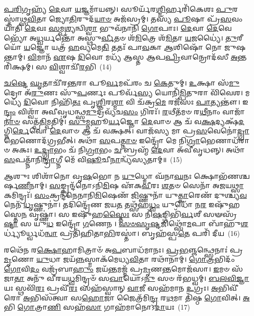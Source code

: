 \-\ul{𑌪}\-\-\ul{𑌰𑌿}\-𑌗𑍃𑌹𑍍𑌯᳴ \ul{𑌦𑍇}\-𑌵𑌾 \ul{𑌯}\-𑌜𑍍𑌞𑌮𑌾᳴𑌯𑌨𑍍𑌨𑍍। 𑌸𑍂𑌰𑍍𑌯᳴𑌰\-\ul{𑌶𑍍𑌮𑌿}\-𑌰𑍍\mbox{}𑌹𑌰𑌿᳴𑌕𑍇𑌶𑌃 \ul{𑌪𑍁}\-𑌰𑌸𑍍𑌤𑌾॑𑌥𑍍𑌸\-\ul{𑌵𑌿}\-𑌤𑌾 𑌜𑍍𑌯𑍋\-\ul{𑌤𑌿}\-𑌰𑍁𑌦᳴\-\ul{𑌯𑌾}\-\-\ul{𑍞} 𑌅𑌜᳴𑌸𑍍𑌰𑌮𑍍। 𑌤𑌸𑍍𑌯᳴ \ul{𑌪𑍂}\-𑌷𑌾 𑌪𑍍𑌰᳴\-\ul{𑌸}\-𑌵𑌂 𑌯𑌾᳴𑌤𑌿 \ul{𑌦𑍇}\-𑌵𑌃 \ul{𑌸}\-𑌮𑍍𑌪\-\ul{𑌶𑍍𑌯}\-𑌨𑍍𑌵𑌿\-\ul{𑌶𑍍𑌵𑌾} 𑌭𑍁𑌵᳴𑌨𑌾𑌨𑌿 \ul{𑌗𑍋}\-𑌪𑌾𑌃। \ul{𑌦𑍇}\-𑌵𑌾 \ul{𑌦𑍇}\-𑌵𑍇𑌭𑍍𑌯𑍋᳴ 𑌅\-\ul{𑌧𑍍𑌵}\-𑌰𑍍𑌯𑌨𑍍𑌤𑍋᳴ 𑌅𑌸𑍍𑌥𑍁\-\ul{𑌰𑍍𑌵𑍀}\-𑌤𑍞 𑌶᳴\-\ul{𑌮𑌿}\-𑌤𑍍𑌰𑍇 𑌶᳴\-\ul{𑌮𑌿}\-𑌤𑌾 \ul{𑌯}\-𑌜𑌧𑍍𑌯𑍈॑। \ul{𑌤𑍁}\-𑌰𑍀𑌯𑍋᳴ \ul{𑌯}\-𑌜𑍍𑌞𑍋 𑌯𑌤𑍍𑌰᳴ \ul{𑌹}\-𑌵𑍍𑌯𑌮𑍇\-\ul{𑌤𑌿} 𑌤𑌤𑌃᳴ 𑌪𑌾\-\ul{𑌵}\-𑌕𑌾 \ul{𑌆}\-𑌶𑌿𑌷𑍋᳴ 𑌨𑍋 𑌜𑍁𑌷𑌨𑍍𑌤𑌾𑌮𑍍। \ul{𑌵𑌿}\-𑌮𑌾𑌨᳴ \ul{𑌏}\-𑌷 \ul{𑌦𑌿}\-𑌵𑍋 𑌮𑌧𑍍𑌯᳴ 𑌆𑌸𑍍𑌤 𑌆𑌪\-\ul{𑌪𑍍𑌰𑌿}\-𑌵𑌾𑌨𑍍𑌰𑍋𑌦᳴𑌸𑍀 \ul{𑌅}\-𑌨𑍍𑌤𑌰𑌿᳴𑌕𑍍𑌷𑌮𑍍। 𑌸 \ul{𑌵𑌿}\-𑌶𑍍𑌵𑌾𑌚𑍀᳴\-\ul{𑌰}\-𑌭𑌿~(14)

\-\ul{𑌚}\-\-\ul{𑌷𑍍𑌟𑍇} \ul{𑌘𑍃}\-𑌤𑌾𑌚𑍀᳴𑌰\-\ul{𑌨𑍍𑌤}\-𑌰𑌾 𑌪𑍂\-\ul{𑌰𑍍𑌵}\-𑌮𑌪᳴𑌰𑌂 𑌚 \ul{𑌕𑍇}\-𑌤𑍁𑌮𑍍। \ul{𑌉}\-𑌕𑍍𑌷𑌾 𑌸᳴\-\ul{𑌮𑍁}\-𑌦𑍍𑌰𑍋 𑌅᳴\-\ul{𑌰𑍁}\-𑌣𑌃 𑌸𑍁᳴\-\ul{𑌪}\-𑌰𑍍𑌣𑌃 𑌪𑍂𑌰𑍍𑌵᳴\-\ul{𑌸𑍍𑌯} 𑌯𑍋𑌨𑌿᳴\-\ul{𑌮𑍍𑌪𑌿}\-𑌤𑍁𑌰𑌾 𑌵𑌿᳴𑌵𑍇𑌶। 𑌮𑌧𑍍𑌯𑍇᳴ \ul{𑌦𑌿}\-𑌵𑍋 𑌨𑌿𑌹𑌿᳴\-\ul{𑌤𑌃} 𑌪𑍃\-\ul{𑌶𑍍𑌞𑌿}\-𑌰\-\ul{𑌶𑍍𑌮𑌾} 𑌵𑌿 𑌚᳴𑌕𑍍𑌰\-\ul{𑌮𑍇} 𑌰𑌜᳴𑌸𑌃 \ul{𑌪𑌾}\-𑌤𑍍𑌯𑌨𑍍𑌤𑍗॑। 𑌇\-\ul{𑌨𑍍𑌦𑍍𑌰𑌂} 𑌵𑌿𑌶𑍍𑌵𑌾᳴ 𑌅𑌵𑍀𑌵𑍃𑌧𑌨𑍍𑌥𑍍𑌸\-\ul{𑌮𑍁}\-𑌦𑍍𑌰𑌵𑍍𑌯᳴𑌚\-\ul{𑌸𑌂} 𑌗𑌿𑌰𑌃᳴। \ul{𑌰}\-𑌥𑍀𑌤᳴𑌮𑍞 𑌰\-\ul{𑌥𑍀}\-𑌨𑌾𑌂 𑌵𑌾𑌜𑌾᳴\-\ul{𑌨𑌾}\-\-\ul{𑍞} 𑌸𑌤𑍍𑌪᳴\-\ul{𑌤𑌿}\-𑌮𑍍𑌪𑌤𑌿𑌮𑍍॑। \ul{𑌸𑍁}\-\-\ul{𑌮𑍍𑌨}\-𑌹𑍂\-\ul{𑌰𑍍𑌯}\-𑌜𑍍𑌞𑍋 \ul{𑌦𑍇}\-𑌵𑌾𑍞 𑌆 𑌚᳴ 𑌵\-\ul{𑌕𑍍𑌷}\-𑌦𑍍𑌯𑌕𑍍𑌷᳴\-\ul{𑌦}\-𑌗𑍍𑌨𑌿\-\ul{𑌰𑍍𑌦𑍇}\-𑌵𑍋 \ul{𑌦𑍇}\-𑌵𑌾𑍞 𑌆 𑌚᳴ 𑌵𑌕𑍍𑌷𑌤𑍍। 𑌵𑌾𑌜᳴𑌸𑍍𑌯 𑌮𑌾 𑌪𑍍𑌰\-\ul{𑌸}\-𑌵𑍇𑌨𑍋॑\-\ul{𑌦𑍍𑌗𑍍𑌰𑌾}\-𑌭𑍇𑌣𑍋𑌦᳴𑌗𑍍𑌰𑌭𑍀𑌤𑍍। 𑌅𑌥𑌾᳴ \ul{𑌸}\-𑌪\-\ul{𑌤𑍍𑌨𑌾}\-\-\ul{𑍞} 𑌇𑌨𑍍𑌦𑍍𑌰𑍋᳴ 𑌮𑍇 𑌨𑌿\-\ul{𑌗𑍍𑌰𑌾}\-𑌭𑍇𑌣𑌾𑌧᳴𑌰𑌾𑍞 𑌅𑌕𑌃। \ul{𑌉}\-\-\ul{𑌦𑍍𑌗𑍍𑌰𑌾}\-𑌭𑌂 𑌚᳴ 𑌨𑌿\-\ul{𑌗𑍍𑌰𑌾}\-𑌭𑌂 \ul{𑌚} 𑌬𑍍𑌰𑌹𑍍𑌮᳴ \ul{𑌦𑍇}\-𑌵𑌾 𑌅᳴𑌵𑍀𑌵𑍃𑌧𑌨𑍍𑌨𑍍। 𑌅𑌥𑌾᳴ \ul{𑌸}\-𑌪𑌤𑍍𑌨𑌾᳴𑌨𑌿\-\ul{𑌨𑍍𑌦𑍍𑌰𑌾}\-𑌗𑍍𑌨𑍀 𑌮𑍇᳴ 𑌵𑌿\-\ul{𑌷𑍂}\-𑌚𑍀\-\ul{𑌨𑌾}\-𑌨𑍍𑌵𑍍𑌯᳴𑌸𑍍𑌯𑌤𑌾𑌮𑍍॥~(15)

{\anuvakamend[{\-\ul{𑌦𑍇}\-𑌵𑌾𑌃 \ul{𑌶}\-𑌤𑌪᳴𑌯𑌾 \ul{𑌅}\-𑌭𑌿 𑌵𑌾𑌜᳴\-\ul{𑌸𑍍𑌯} 𑌷𑌡𑍍𑌵𑌿𑍞᳴𑌶𑌤𑌿𑌶𑍍𑌚}]}%

\-\ul{𑌆}\-𑌶𑍁𑌃 𑌶𑌿𑌶𑌾᳴𑌨𑍋 𑌵𑍃\-\ul{𑌷}\-𑌭𑍋 𑌨 \ul{𑌯𑍁}\-𑌧𑍍𑌮𑍋 𑌘᳴𑌨𑌾\-\ul{𑌘}\-𑌨𑌃 𑌕𑍍𑌷𑍋𑌭᳴𑌣𑌶𑍍𑌚𑌰𑍍\mbox{}𑌷\-\ul{𑌣𑍀}\-𑌨𑌾𑌮𑍍। \ul{𑌸}\-𑌙𑍍𑌕𑍍𑌰𑌨𑍍𑌦᳴𑌨𑍋\-𑌽𑌨𑌿\-\ul{𑌮𑌿}\-𑌷 𑌏᳴𑌕\-\ul{𑌵𑍀}\-𑌰𑌃 \ul{𑌶}\-𑌤𑍞 𑌸𑍇𑌨𑌾᳴ 𑌅𑌜𑌯\-\ul{𑌥𑍍𑌸𑌾}\-𑌕𑌮𑌿𑌨𑍍𑌦𑍍𑌰𑌃᳴। \ul{𑌸𑌂}\-𑌕𑍍𑌰𑌨𑍍𑌦᳴𑌨𑍇𑌨𑌾𑌨𑌿\-\ul{𑌮𑌿}\-𑌷𑍇𑌣᳴ \ul{𑌜𑌿}\-𑌷𑍍𑌣𑍁𑌨𑌾᳴ 𑌯𑍁\-\ul{𑌤𑍍𑌕𑌾}\-𑌰𑍇𑌣᳴ 𑌦𑍁𑌶𑍍𑌚𑍍𑌯\-\ul{𑌵}\-𑌨𑍇𑌨᳴ \ul{𑌧𑍃}\-𑌷𑍍𑌣𑍁𑌨𑌾॑। 𑌤𑌦𑌿𑌨𑍍𑌦𑍍𑌰𑍇᳴𑌣 𑌜𑌯\-\ul{𑌤} 𑌤𑌥𑍍𑌸᳴𑌹\-\ul{𑌧𑍍𑌵𑌂} 𑌯𑍁𑌧𑍋᳴ 𑌨\-\ul{𑌰} 𑌇𑌷𑍁᳴𑌹𑌸𑍍𑌤𑍇\-\ul{𑌨} 𑌵𑍃𑌷𑍍𑌣𑌾॑। 𑌸 𑌇𑌷𑍁᳴𑌹\-\ul{𑌸𑍍𑌤𑍈𑌃} 𑌸 𑌨𑌿᳴\-\ul{𑌷}\-𑌙𑍍𑌗𑌿𑌭𑌿᳴\-\ul{𑌰𑍍𑌵}\-𑌶𑍀 𑌸𑍟𑌸𑍍𑌰᳴\-\ul{𑌷𑍍𑌟𑌾} 𑌸 𑌯𑍁\-\ul{𑌧} 𑌇𑌨𑍍𑌦𑍍𑌰𑍋᳴ \ul{𑌗}\-𑌣𑍇𑌨। \ul{𑌸}\-\-\ul{𑍞}\-\-\ul{𑌸𑍃}\-\-\ul{𑌷𑍍𑌟}\-𑌜𑌿𑌥𑍍𑌸𑍋᳴\-\ul{𑌮}\-𑌪𑌾 𑌬𑌾᳴𑌹𑍁\-\ul{𑌶}\-𑌰𑍍𑌧𑍍𑌯𑍂॑𑌰𑍍𑌧𑍍𑌵𑌧᳴\-\ul{𑌨𑍍𑌵𑌾} 𑌪𑍍𑌰𑌤𑌿᳴𑌹𑌿𑌤𑌾\-\ul{𑌭𑌿}\-𑌰𑌸𑍍𑌤𑌾॑। 𑌬𑍃𑌹᳴𑌸𑍍𑌪\-\ul{𑌤𑍇} 𑌪𑌰𑌿᳴ 𑌦𑍀𑌯~(16)

𑌰𑌥𑍇᳴𑌨 𑌰\-\ul{𑌕𑍍𑌷𑍋}\-𑌹𑌾𑌮𑌿𑌤𑍍𑌰𑌾𑍞᳴ 𑌅\-\ul{𑌪}\-𑌬𑌾𑌧᳴𑌮𑌾𑌨𑌃। \ul{𑌪𑍍𑌰}\-\-\ul{𑌭}\-𑌞𑍍𑌜𑌨𑍍𑌥𑍍𑌸𑍇𑌨𑌾𑌃॑ 𑌪𑍍𑌰\-\ul{𑌮𑍃}\-𑌣𑍋 \ul{𑌯𑍁}\-𑌧𑌾 𑌜𑌯᳴\-\ul{𑌨𑍍𑌨}\-𑌸𑍍𑌮𑌾𑌕᳴𑌮𑍇𑌧𑍍𑌯\-\ul{𑌵𑌿}\-𑌤𑌾 𑌰𑌥𑌾᳴𑌨𑌾𑌮𑍍। \ul{𑌗𑍋}\-\-\ul{𑌤𑍍𑌰}\-𑌭𑌿𑌦𑌂᳴ \ul{𑌗𑍋}\-𑌵𑌿\-\ul{𑌦𑌂} 𑌵𑌜𑍍𑌰᳴𑌬𑌾\-\ul{𑌹𑍁𑌂} 𑌜𑌯᳴\-\ul{𑌨𑍍𑌤}\-𑌮𑌜𑍍𑌮᳴ 𑌪𑍍𑌰\-\ul{𑌮𑍃}\-𑌣\-\ul{𑌨𑍍𑌤}\-𑌮𑍋𑌜᳴𑌸𑌾। \ul{𑌇}\-𑌮𑍞 𑌸᳴𑌜𑌾\-\ul{𑌤𑌾} 𑌅𑌨𑍁᳴ 𑌵𑍀𑌰𑌯\-\ul{𑌧𑍍𑌵}\-𑌮𑌿𑌨𑍍𑌦𑍍𑌰𑍞᳴ 𑌸\-\ul{𑌖𑌾}\-𑌯𑍋\-𑌽\-\ul{𑌨𑍁} 𑌸𑍞 𑌰᳴𑌭𑌧𑍍𑌵𑌮𑍍। \ul{𑌬}\-\-\ul{𑌲}\-\-\ul{𑌵𑌿}\-\-\ul{𑌜𑍍𑌞𑌾}\-𑌯𑌃 𑌸𑍍𑌥𑌵𑌿᳴\-\ul{𑌰𑌃} 𑌪𑍍𑌰𑌵𑍀᳴\-\ul{𑌰𑌃} 𑌸𑌹᳴𑌸𑍍𑌵𑌾𑌨𑍍 \ul{𑌵𑌾}\-𑌜𑍀 𑌸𑌹᳴𑌮𑌾𑌨 \ul{𑌉}\-𑌗𑍍𑌰𑌃। \ul{𑌅}\-𑌭𑌿𑌵𑍀᳴𑌰𑍋 \ul{𑌅}\-𑌭𑌿𑌸᳴𑌤𑍍𑌵𑌾 𑌸\-\ul{𑌹𑍋}\-𑌜𑌾 𑌜𑍈𑌤𑍍𑌰᳴𑌮𑌿\-\ul{𑌨𑍍𑌦𑍍𑌰} 𑌰\-\ul{𑌥}\-𑌮𑌾 𑌤𑌿᳴𑌷𑍍𑌠 \ul{𑌗𑍋}\-𑌵𑌿𑌤𑍍। \ul{𑌅}\-𑌭𑌿 \ul{𑌗𑍋}\-𑌤𑍍𑌰𑌾\-\ul{𑌣𑌿} 𑌸𑌹᳴\-\ul{𑌸𑌾} 𑌗𑌾𑌹᳴𑌮𑌾𑌨𑍋\-𑌽\-\ul{𑌦𑌾}\-𑌯𑌃~(17)

